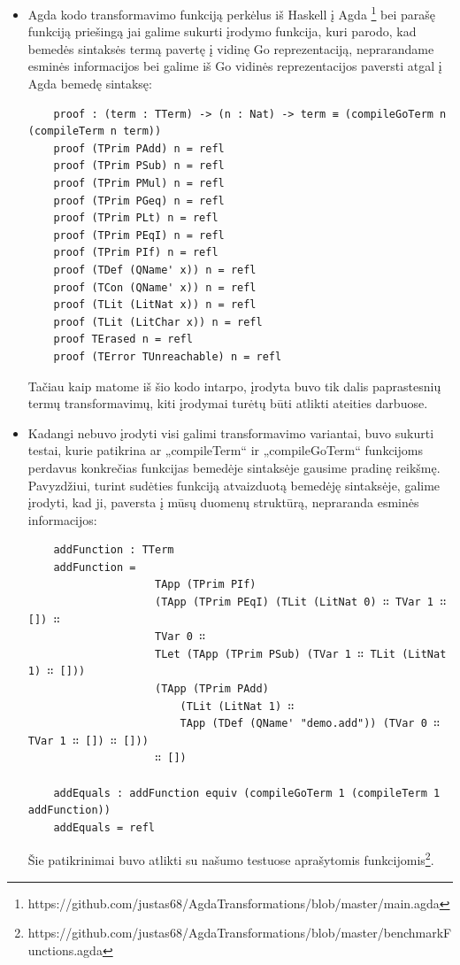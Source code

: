 \documentclass{VUMIFPSkursinis}
\begin{document}
	 \begin{itemize}
		\item Agda kodo transformavimo funkciją perkėlus iš Haskell į Agda \footnote{https://github.com/justas68/AgdaTransformations/blob/master/main.agda} bei parašę funkciją priešingą jai galime sukurti įrodymo funkcija, kuri parodo, kad bemedės sintaksės termą pavertę į vidinę Go reprezentaciją, neprarandame esminės informacijos bei galime iš Go vidinės reprezentacijos paversti atgal į Agda bemedę sintaksę:
\begin{lstlisting}
	proof : (term : TTerm) -> (n : Nat) -> term ≡ (compileGoTerm n (compileTerm n term)) 
	proof (TPrim PAdd) n = refl
	proof (TPrim PSub) n = refl
	proof (TPrim PMul) n = refl
	proof (TPrim PGeq) n = refl
	proof (TPrim PLt) n = refl
	proof (TPrim PEqI) n = refl
	proof (TPrim PIf) n = refl
	proof (TDef (QName' x)) n = refl
	proof (TCon (QName' x)) n = refl
	proof (TLit (LitNat x)) n = refl
	proof (TLit (LitChar x)) n = refl
	proof TErased n = refl
	proof (TError TUnreachable) n = refl
		\end{lstlisting}
		Tačiau kaip matome iš šio kodo intarpo, įrodyta buvo tik dalis paprastesnių termų transformavimų, kiti įrodymai turėtų būti atlikti ateities darbuose.
		\item Kadangi nebuvo įrodyti visi galimi transformavimo variantai, buvo sukurti testai, kurie patikrina ar „compileTerm“ ir „compileGoTerm“ funkcijoms perdavus konkrečias funkcijas bemedėje sintaksėje gausime pradinę reikšmę. Pavyzdžiui, turint sudėties funkciją atvaizduotą bemedėję sintaksėje, galime įrodyti, kad ji, paversta į mūsų duomenų struktūrą, nepraranda esminės informacijos:
\begin{lstlisting}
	addFunction : TTerm
	addFunction = 
					TApp (TPrim PIf)
					(TApp (TPrim PEqI) (TLit (LitNat 0) ∷ TVar 1 ∷ []) ∷
					TVar 0 ∷
					TLet (TApp (TPrim PSub) (TVar 1 ∷ TLit (LitNat 1) ∷ []))
					(TApp (TPrim PAdd)
						(TLit (LitNat 1) ∷
						TApp (TDef (QName' "demo.add")) (TVar 0 ∷ TVar 1 ∷ []) ∷ []))
					∷ [])
	
	addEquals : addFunction equiv (compileGoTerm 1 (compileTerm 1 addFunction))
	addEquals = refl
		\end{lstlisting}
		Šie patikrinimai buvo atlikti su našumo testuose aprašytomis funkcijomis\footnote{https://github.com/justas68/AgdaTransformations/blob/master/benchmarkFunctions.agda}.
	\end{itemize}
\end{document}
